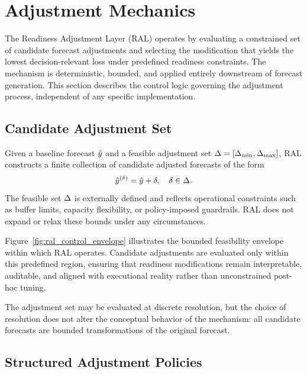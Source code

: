 \section{Adjustment Mechanics}

The Readiness Adjustment Layer (RAL) operates by evaluating a constrained set of
candidate forecast adjustments and selecting the modification that yields the
lowest decision-relevant loss under predefined readiness constraints. The
mechanism is deterministic, bounded, and applied entirely downstream of forecast
generation. This section describes the control logic governing the adjustment
process, independent of any specific implementation.

\subsection{Candidate Adjustment Set}

Given a baseline forecast \(\hat{y}\) and a feasible adjustment set
\(\Delta = [\Delta_{\min}, \Delta_{\max}]\), RAL constructs a finite collection of
candidate adjusted forecasts of the form
\[
\hat{y}^{(\delta)} = \hat{y} + \delta, \quad \delta \in \Delta.
\]
The feasible set \(\Delta\) is externally defined and reflects operational
constraints such as buffer limits, capacity flexibility, or policy-imposed
guardrails. RAL does not expand or relax these bounds under any circumstances.



Figure~\ref{fig:ral_control_envelope} illustrates the bounded feasibility
envelope within which RAL operates. Candidate adjustments are evaluated only
within this predefined region, ensuring that readiness modifications remain
interpretable, auditable, and aligned with executional reality rather than
unconstrained post-hoc tuning.

The adjustment set may be evaluated at discrete resolution, but the choice of
resolution does not alter the conceptual behavior of the mechanism: all candidate
forecasts are bounded transformations of the original forecast.

\subsection{Structured Adjustment Policies}
\label{subsec:structured_adjustment_policies}

